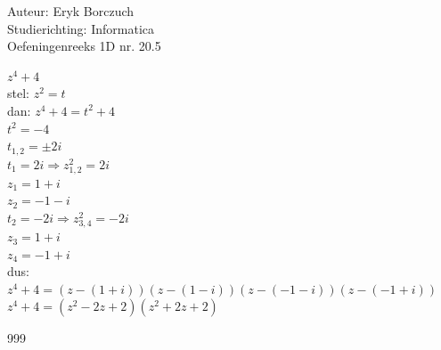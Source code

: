 \documentclass[a4paper]{article}
\begin{document}
  
\noindent \large Auteur: Eryk Borczuch \\
\noindent \large Studierichting: Informatica\\
\noindent \large Oefeningenreeks 1D nr. 20.5\\

\medskip

\normalsize

$z^4 +4$\\

stel: $z^2 = t$\\

dan: $z^4+4 = t^2+4$\\

$t^2 = -4$\\

$t_{1,2} = \pm 2i$\\

$t_1 = 2i \Rightarrow z_{1,2}^2 = 2i$\\

$z_1 = 1+i$\\

$z_2 = -1-i$\\

$t_2 = -2i \Rightarrow z_{3,4}^2 = -2i$\\

$z_3 = 1+i$\\

$z_4 = -1+i$\\

dus: $z^4 +4 = (z-(1+i))(z-(1-i))(z-(-1-i))(z-(-1+i))$\\

$z^4 + 4 = (z^2-2z+2)(z^2+2z+2)$

\begin{thebibliography}{999}
\end{thebibliography}
\end{document}
